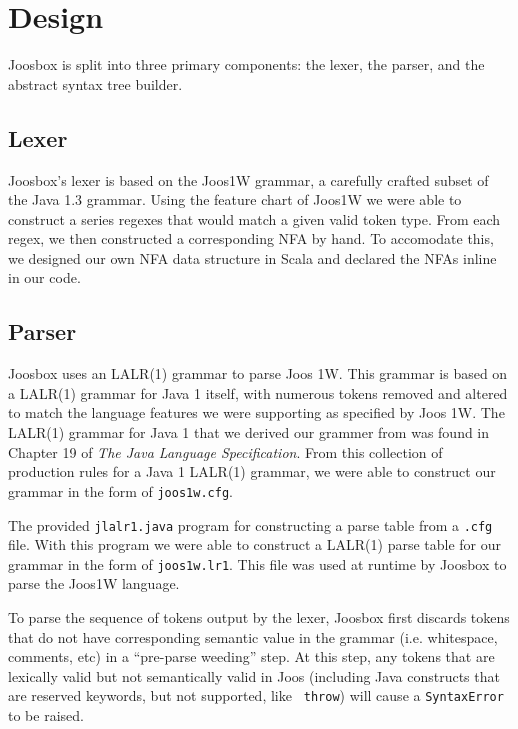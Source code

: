 \documentclass[letterpaper]{article}
\begin{document}
  \section{Design}

  Joosbox is split into three primary components: the lexer, the parser, and the
  abstract syntax tree builder.

  \subsection{Lexer}

  Joosbox's lexer is based on the Joos1W grammar, a carefully crafted subset of
  the Java 1.3 grammar. Using the feature chart of Joos1W we were able to
  construct a series regexes that would match a given valid token type. From
  each regex, we then constructed a corresponding NFA by hand. To accomodate
  this, we designed our own NFA data structure in Scala and declared the NFAs
  inline in our code.

  \subsection{Parser}

  Joosbox uses an LALR(1) grammar to parse Joos 1W. This grammar is based on a
  LALR(1) grammar for Java 1 itself, with numerous tokens removed and altered to
  match the language features we were supporting as specified by Joos 1W. The
  LALR(1) grammar for Java 1 that we derived our grammer from was found in
  Chapter 19 of {\em The Java Language Specification}. From this collection of
  production rules for a Java 1 LALR(1) grammar, we were able to construct our
  grammar in the form of {\tt joos1w.cfg}.

  The provided {\tt jlalr1.java} program for constructing a parse table from a
  {\tt.cfg} file. With this program we were able to construct a LALR(1) parse
  table for our grammar in the form of {\tt joos1w.lr1}. This file was used at
  runtime by Joosbox to parse the Joos1W language.

  To parse the sequence of tokens output by the lexer, Joosbox first discards
  tokens that do not have corresponding semantic value in the grammar (i.e.
  whitespace, comments, etc) in a ``pre-parse weeding'' step. At this step, any
  tokens that are lexically valid but not semantically valid in Joos (including
  Java constructs that are reserved keywords, but not supported, like {\tt
  throw}) will cause a {\tt SyntaxError} to be raised.
\end{document}
